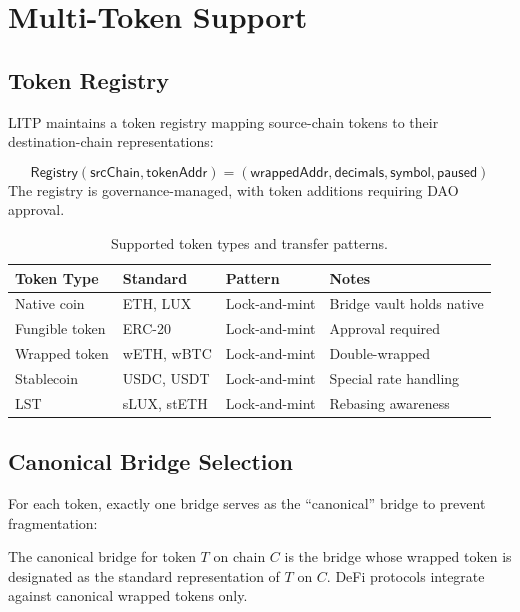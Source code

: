 \section{Multi-Token Support}
\label{sec:multitoken}

\subsection{Token Registry}

LITP maintains a token registry mapping source-chain tokens to their destination-chain representations:

\begin{definition}
\begin{equation}
    \mathsf{Registry}(\mathsf{srcChain}, \mathsf{tokenAddr}) = (\mathsf{wrappedAddr}, \mathsf{decimals}, \mathsf{symbol}, \mathsf{paused})
\end{equation}
The registry is governance-managed, with token additions requiring DAO approval.
\end{definition}

\begin{table}[H]
\centering
\caption{Supported token types and transfer patterns.}
\label{tab:tokentypes}
\begin{tabular}{llll}
\toprule
\textbf{Token Type} & \textbf{Standard} & \textbf{Pattern} & \textbf{Notes} \\
\midrule
Native coin & ETH, LUX & Lock-and-mint & Bridge vault holds native \\
Fungible token & ERC-20 & Lock-and-mint & Approval required \\
Wrapped token & wETH, wBTC & Lock-and-mint & Double-wrapped \\
Stablecoin & USDC, USDT & Lock-and-mint & Special rate handling \\
LST & sLUX, stETH & Lock-and-mint & Rebasing awareness \\
\bottomrule
\end{tabular}
\end{table}

\subsection{Canonical Bridge Selection}

For each token, exactly one bridge serves as the ``canonical'' bridge to prevent fragmentation:

\begin{definition}
The canonical bridge for token $T$ on chain $C$ is the bridge whose wrapped token is designated as the standard representation of $T$ on $C$. DeFi protocols integrate against canonical wrapped tokens only.
\end{definition}

